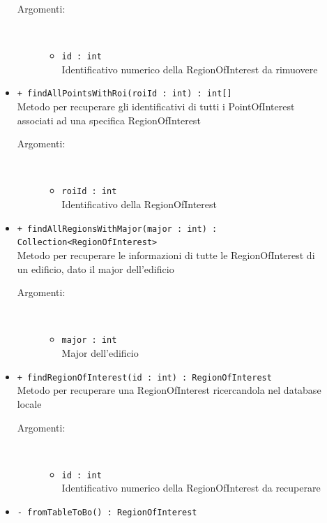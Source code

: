 \documentclass[../DefinizioneDiProdotto.tex]{subfiles}
\begin{document}
\begin{description}
\begin{itemize}
\begin{description}
			\item[Argomenti:] \
			\begin{itemize}
				\item \texttt{id : int}\\
				Identificativo numerico della RegionOfInterest da rimuovere\end{itemize}
		\end{description}
		\item \texttt{+ findAllPointsWithRoi(roiId : int) : int[]}\\
		Metodo per recuperare gli identificativi di tutti i PointOfInterest associati ad una specifica RegionOfInterest
		\begin{description}
			\item[Argomenti:] \
			\begin{itemize}
				\item \texttt{roiId : int}\\
				Identificativo della RegionOfInterest\end{itemize}
		\end{description}
		\item \texttt{+ findAllRegionsWithMajor(major : int) : Collection<RegionOfInterest>}\\
		Metodo per recuperare le informazioni di tutte le RegionOfInterest di un edificio, dato il major dell'edificio
		\begin{description}
			\item[Argomenti:] \
			\begin{itemize}
				\item \texttt{major : int}\\
				Major dell'edificio\end{itemize}
		\end{description}
		\item \texttt{+ findRegionOfInterest(id : int) : RegionOfInterest}\\
		Metodo per recuperare una RegionOfInterest ricercandola nel database locale
		\begin{description}
			\item[Argomenti:] \
			\begin{itemize}
				\item \texttt{id : int}\\
				Identificativo numerico della RegionOfInterest da recuperare\end{itemize}
		\end{description}
		\item \texttt{- fromTableToBo() : RegionOfInterest}\\

\end{itemize}
\end{description}
\end{document}
